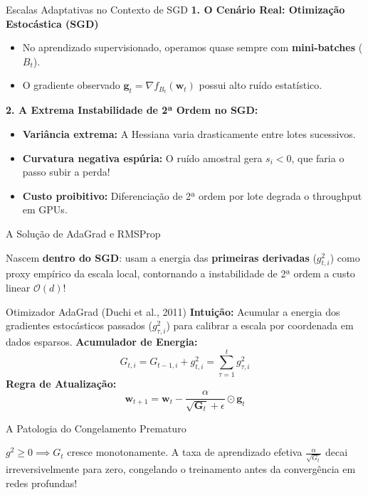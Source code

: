 \documentclass[aspectratio=169, 10pt]{beamer}
\newenvironment{callouttip}[1][Dica]{%
  \begin{exampleblock}{#1}%
}{%
  \end{exampleblock}%
}
\newenvironment{calloutwarning}[1][Atenção]{%
  \begin{alertblock}{#1}%
}{%
  \end{alertblock}%
}
\begin{document}
\begin{frame}{Escalas Adaptativas no Contexto de SGD}
  \textbf{1. O Cenário Real: Otimização Estocástica (SGD)}
  \begin{itemize}
    \item No aprendizado supervisionado, operamos quase sempre com \textbf{mini-batches} ($B_t$).
    \item O gradiente observado $\mathbf{g}_t = \nabla f_{B_t}(\mathbf{w}_t)$ possui alto ruído estatístico.
  \end{itemize}
  \vspace{0.2cm}
  \textbf{2. A Extrema Instabilidade de 2ª Ordem no SGD:}
  \begin{itemize}
    \item \textbf{Variância extrema:} A Hessiana varia drasticamente entre lotes sucessivos.
    \item \textbf{Curvatura negativa espúria:} O ruído amostral gera $s_i < 0$, que faria o passo subir a perda!
    \item \textbf{Custo proibitivo:} Diferenciação de 2ª ordem por lote degrada o throughput em GPUs.
  \end{itemize}
  \vspace{0.3cm}
  \begin{callouttip}[A Solução de AdaGrad e RMSProp]
    Nascem \textbf{dentro do SGD}: usam a energia das \textbf{primeiras derivadas} ($g_{t, i}^2$) como proxy empírico da escala local, contornando a instabilidade de 2ª ordem a custo linear $\mathcal{O}(d)$!
  \end{callouttip}
\end{frame}

\begin{frame}{Otimizador AdaGrad (Duchi et al., 2011)}
  \textbf{Intuição:} Acumular a energia dos gradientes estocásticos passados ($g_{\tau, i}^2$) para calibrar a escala por coordenada em dados esparsos.
  \vspace{0.2cm}
  \textbf{Acumulador de Energia:}
  \[G_{t, i} = G_{t-1, i} + g_{t, i}^2 = \sum_{\tau=1}^t g_{\tau, i}^2\]
  \vspace{0.2cm}
  \textbf{Regra de Atualização:}
  \[\mathbf{w}_{t+1} = \mathbf{w}_t - \frac{\alpha}{\sqrt{\mathbf{G}_t} + \epsilon} \odot \mathbf{g}_t\]
  \vspace{0.3cm}
  \begin{calloutwarning}[A Patologia do Congelamento Prematuro]
    $g^2 \ge 0 \implies G_t$ cresce monotonamente. A taxa de aprendizado efetiva $\frac{\alpha}{\sqrt{G_t}}$ decai irreversivelmente para zero, congelando o treinamento antes da convergência em redes profundas!
  \end{calloutwarning}
\end{frame}
\end{document}
